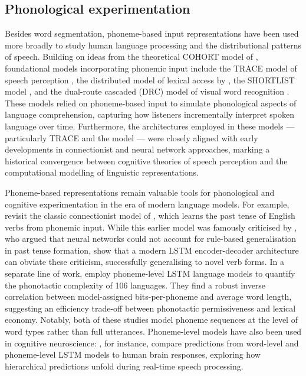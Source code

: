 


\subsection{Phonological experimentation}\label{sec:12-phonexperiment}


Besides word segmentation, phoneme-based input representations have been used more broadly to study human language processing and the distributional patterns of speech. Building on ideas from the theoretical COHORT model of \citet{MARSLENWILSON1978}, foundational models incorporating phonemic input include the TRACE model of speech perception \citep{mcclelland1986trace}, the distributed model of lexical access by \citet{seidenberg1989distributed}, the SHORTLIST model \citep{norris1994shortlist}, and the dual-route cascaded (DRC) model of visual word recognition \citep{coltheart2001drc}. These models relied on phoneme-based input to simulate phonological aspects of language comprehension, capturing how listeners incrementally interpret spoken language over time. Furthermore, the architectures employed in these models --- particularly TRACE and the \citet{seidenberg1989distributed} model --- were closely aligned with early developments in connectionist and neural network approaches, marking a historical convergence between cognitive theories of speech perception and the computational modelling of linguistic representations.

Phoneme-based representations remain valuable tools for phonological and cognitive experimentation in the era of modern language models. For example, \citet{kirov-2018-recurrent} revisit the classic connectionist model of \citet{Rumelhart1986}, which learns the past tense of English verbs from phonemic input. While this earlier model was famously criticised by \citet{pinker_language_1988}, who argued that neural networks could not account for rule-based generalisation in past tense formation, \citet{kirov-2018-recurrent} show that a modern LSTM encoder-decoder architecture can obviate these criticism, successfully generalising to novel verb forms. In a separate line of work, \citet{pimentel2020phonotactic} employ phoneme-level LSTM language models to quantify the phonotactic complexity of 106 languages. They find a robust inverse correlation between model-assigned bits-per-phoneme and average word length, suggesting an efficiency trade-off between phonotactic permissiveness and lexical economy. Notably, both of these studies model phoneme sequences at the level of word types rather than full utterances. Phoneme-level models have also been used in cognitive neuroscience: \citet{donhauser2020two}, for instance, compare predictions from word-level and phoneme-level LSTM models to human brain responses, exploring how hierarchical predictions unfold during real-time speech processing.%

